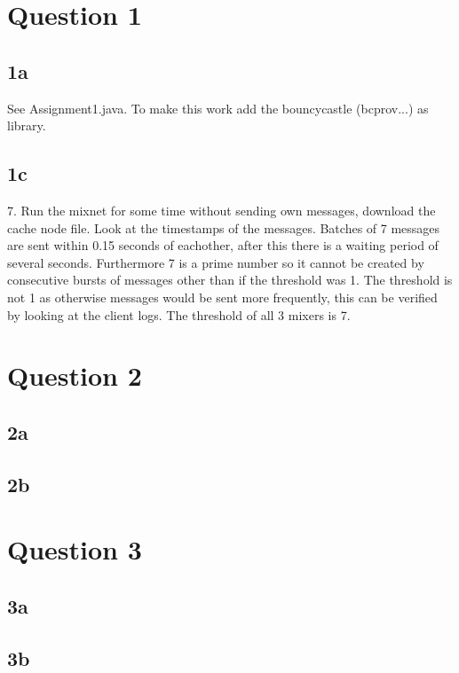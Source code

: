 \documentclass{article}
\begin{document}
\section*{Question 1}
\subsection*{1a}
 See Assignment1.java. To make this work add the bouncycastle (bcprov...) as library.
\subsection*{1c}
7. Run the mixnet for some time without sending own messages, download the cache node file. Look at the timestamps of the messages. Batches of 7 messages are sent within 0.15 seconds of eachother, after this there is a waiting period of several seconds. Furthermore 7 is a prime number so it cannot be created by consecutive bursts of messages other than if the threshold was 1. The threshold is not 1 as otherwise messages would be sent more frequently, this can be verified by looking at the client logs. The threshold of all 3 mixers is 7.

\section*{Question 2}
\subsection*{2a}
\subsection*{2b}

\section*{Question 3}
\subsection*{3a}
\subsection*{3b}
\end{document}
